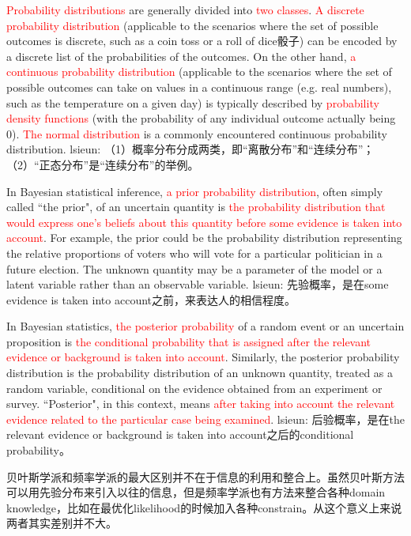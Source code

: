 \documentclass[UTF8]{ctexart}
\begin{document}
\textcolor{red}{Probability distributions} are generally divided into \textcolor{red}{two classes}. \textcolor{red}{A discrete probability distribution} (applicable to the scenarios where the set of possible outcomes is discrete, such as a coin toss or a roll of dice骰子) can be encoded by a discrete list of the probabilities of the outcomes. On the other hand, \textcolor{red}{a continuous probability distribution} (applicable to the scenarios where the set of possible outcomes can take on values in a continuous range (e.g. real numbers), such as the temperature on a given day) is typically described by \textcolor{red}{probability density functions} (with the probability of any individual outcome actually being 0). \textcolor{red}{The normal distribution} is a commonly encountered continuous probability distribution. lsieun: （1）概率分布分成两类，即“离散分布”和“连续分布”；（2）“正态分布”是“连续分布”的举例。

In Bayesian statistical inference, \textcolor{red}{a prior probability distribution}, often simply called ``the prior", of an uncertain quantity is \textcolor{red}{the probability distribution that would express one's beliefs about this quantity before some evidence is taken into account}. For example, the prior could be the probability distribution representing the relative proportions of voters who will vote for a particular politician in a future election. The unknown quantity may be a parameter of the model or a latent variable rather than an observable variable.  lsieun: 先验概率，是在some evidence is taken into account之前，来表达人的相信程度。

In Bayesian statistics,  \textcolor{red}{the posterior probability} of a random event or an uncertain proposition is  \textcolor{red}{the conditional probability that is assigned after the relevant evidence or background is taken into account}. Similarly, the posterior probability distribution is the probability distribution of an unknown quantity, treated as a random variable, conditional on the evidence obtained from an experiment or survey. ``Posterior", in this context, means \textcolor{red}{after taking into account the relevant evidence related to the particular case being examined}. lsieun: 后验概率，是在the relevant evidence or background is taken into account之后的conditional probability。

贝叶斯学派和频率学派的最大区别并不在于信息的利用和整合上。虽然贝叶斯方法可以用先验分布来引入以往的信息，但是频率学派也有方法来整合各种domain knowledge，比如在最优化likelihood的时候加入各种constrain。从这个意义上来说两者其实差别并不大。
\end{document}
